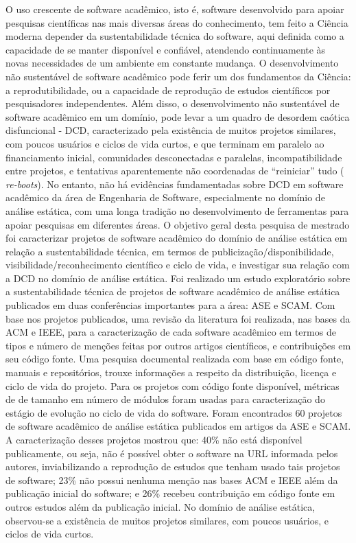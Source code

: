 O uso crescente de software acadêmico, isto é, software desenvolvido para
apoiar pesquisas científicas nas mais diversas áreas do conhecimento, tem feito
a Ciência moderna depender da sustentabilidade técnica do software, aqui
definida como a capacidade de se manter disponível e confiável, atendendo
continuamente às novas necessidades de um ambiente em constante mudança.
%
O desenvolvimento não sustentável de software acadêmico pode ferir um dos
fundamentos da Ciência: a reprodutibilidade, ou a capacidade de reprodução de
estudos científicos por pesquisadores independentes. 
%
Além disso, o desenvolvimento não sustentável de software acadêmico em um
domínio, pode levar a um quadro de desordem caótica disfuncional - DCD,
caracterizado pela existência de muitos projetos similares, com poucos usuários
e ciclos de vida curtos, e que terminam em paralelo ao financiamento inicial,
comunidades desconectadas e paralelas, incompatibilidade entre projetos, e
tentativas aparentemente não coordenadas de ``reiniciar'' tudo ({\it
re-boots}).
%
No entanto, não há evidências fundamentadas sobre DCD em software acadêmico da
área de Engenharia de Software, especialmente no domínio de análise estática,
com uma longa tradição no desenvolvimento de ferramentas para apoiar pesquisas
em diferentes áreas.
%
O objetivo geral desta pesquisa de mestrado foi caracterizar projetos de
software acadêmico do domínio de análise estática em relação a sustentabilidade
técnica, em termos de publicização/disponibilidade, visibilidade/reconhecimento
científico e ciclo de vida, e investigar sua relação com a DCD no domínio de
análise estática.
%
Foi realizado um estudo exploratório sobre a sustentabilidade técnica de
projetos de software acadêmico de análise estática publicados em duas
conferências importantes para a área: ASE e SCAM.
%
Com base nos projetos publicados, uma revisão da literatura foi realizada, nas
bases da ACM e IEEE, para a caracterização de cada software acadêmico em termos
de tipos e número de menções feitas por outros artigos científicos, e
contribuições em seu código fonte.
%
Uma pesquisa documental realizada com base em código fonte, manuais e
repositórios, trouxe informações a respeito da distribuição, licença e ciclo de
vida do projeto.
%
Para os projetos com código fonte disponível, métricas de de tamanho em número
de módulos foram usadas para caracterização do estágio de evolução no ciclo de
vida do software.
%
Foram encontrados 60 projetos de software acadêmico de análise estática
publicados em artigos da ASE e SCAM.
%
A caracterização desses projetos mostrou que: 40\% não está disponível
publicamente, ou seja, não é possível obter o software na URL informada pelos
autores, inviabilizando a reprodução de estudos que tenham usado tais projetos
de software;
%
23\% não possui nenhuma menção nas bases ACM e IEEE além da publicação inicial
do software; e 26\% recebeu contribuição em código fonte em outros estudos além
da publicação inicial.
%
No domínio de análise estática, observou-se a existência de muitos projetos
similares, com poucos usuários, e ciclos de vida curtos.

